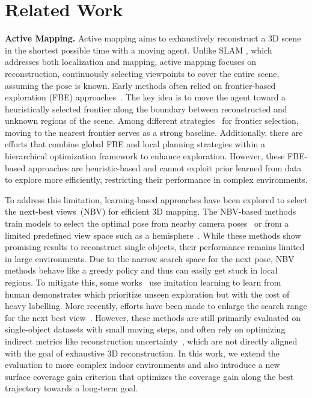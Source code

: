 \section{Related Work}

\noindent \textbf{Active Mapping.} 
%
Active mapping aims to exhaustively reconstruct a 3D scene in the shortest possible time with a moving agent. 
Unlike SLAM \citep{learningslam, slam_survey, gaussian_slam}, which addresses both localization and mapping, active mapping focuses on reconstruction, continuously selecting viewpoints to cover the entire scene, assuming the pose is known.
Early methods often relied on frontier-based exploration (FBE) approaches~\citep{fbe}. The key idea is to move the agent toward a heuristically selected frontier along the boundary between reconstructed and unknown regions of the scene. 
Among different strategies~\citep{nbvp, cieslewski2017rapid, zhou2021fuel, tao2023seer} for frontier selection, moving to the nearest frontier serves as a strong baseline.
Additionally, there are efforts \citep{cao2021tare, xu2024heuristic} that combine global FBE and local planning strategies within a hierarchical optimization framework to enhance exploration.
However, these FBE-based approaches are heuristic-based and cannot exploit prior learned from data to explore more efficiently, restricting their performance in complex environments.

To address this limitation, learning-based approaches have been explored to select the next-best views~(NBV) for efficient 3D mapping.
The NBV-based methods train models to select the optimal pose from nearby camera poses~\citep{guedon2022scone, guedon2023macarons, lee2023so} or from a limited predefined view space such as a hemisphere~\citep{zhan2022activermap, uncertaintypolicy, rlnbv, zeng2020pc, mendoza2020supervisednbv}. 
While these methods show promising results to reconstruct single objects, their performance remains limited in large environments.
Due to the narrow search space for the next pose, NBV methods behave like a greedy policy and thus can easily get stuck in local regions.
To mitigate this, some works~\cite{ramrakhya2022habitatweb,chen2023object} use imitation learning to learn from human demonstrates which prioritize unseen exploration but with the cost of heavy labelling.
More recently, efforts have been made to enlarge the search range for the next best view~\citep{chen2024gennbv, ran2023neurar, pan2022activenerf, upen}. However, these methods are still primarily evaluated on single-object datasets with small moving steps, and often rely on optimizing indirect metrics like reconstruction uncertainty~\citep{upen}, which are not directly aligned with the goal of exhaustive 3D reconstruction. %
In this work, we extend the evaluation to more complex indoor environments and also introduce a new surface coverage gain criterion that optimizes the coverage gain along the best trajectory towards a long-term goal.


